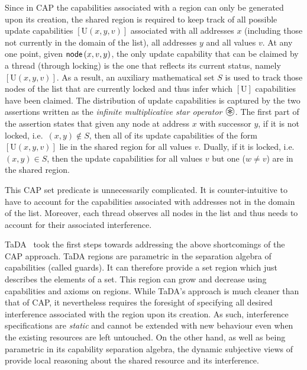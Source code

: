 Since in CAP the capabilities associated with a region can only be generated upon its creation, the shared region is required to keep track of all possible update capabilities $[\text{U}(x, y, v)]$ associated with all addresses $x$ (including those not currently in the domain of the list), all addresses $y$ and all values $v$. At any one point, given $\textsf{node}\left(x, v, y\right)$, the only update capability that can be claimed by a thread (through locking) is the one that reflects its current status, namely $[\text{U}(x, y, v)]$. As a result, an auxiliary mathematical set $S$ is used to track those nodes of the list that are currently locked and thus infer which $[\text{U}]$ capabilities have been claimed. The distribution of update capabilities is captured by the two assertions written as the \emph{infinite multiplicative star operator} $\iterStar$. The first part of the assertion states that given any node at address $x$ with successor $y$, if it is not locked, i.e.\ $(x, y) \not\in S$, then {all} of its update capabilities of the form $[\text{U}(x, y, v)]$ lie in the shared region for {all} values $v$. Dually, if it is locked, i.e.\ $(x, y) \in S$, then the update capabilities for {all} values $v$ {but one} ($w \not= v$) are in the shared region.

This CAP set predicate is unnecessarily complicated. It is counter-intuitive
to have to  account for the capabilities associated with   addresses not in the domain of the list. Moreover, each thread observes all nodes in the list and thus needs to account for their associated interference. 

TaDA~\cite{tada} took the first steps towards addressing the above
shortcomings of the CAP approach. TaDA regions are parametric in the
separation algebra of capabilities (called guards). It can  therefore
provide  a set region which just
describes the elements of a set. This region   can grow and decrease using
capabilities and axioms on regions. 
While TaDA's approach is much cleaner than that of CAP, it nevertheless requires the foresight of specifying all desired interference associated with the region upon its creation. 
As such, interference specifications are \emph{static} and cannot be extended with new behaviour even when the existing resources are left untouched. 
On the other hand, as well as being parametric in its capability
separation algebra, the dynamic subjective views of \colosl provide
local reasoning about  the shared resource and its interference. 
%

